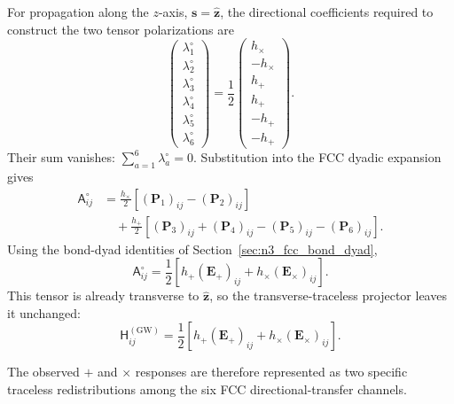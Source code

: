For propagation along the $z$-axis, $\mathbf{s}=\hat{\mathbf{z}}$, the directional coefficients required to construct the two tensor polarizations are
\begin{equation}
    \begin{pmatrix}
        \lambda_{1}^{\circ} \\
        \lambda_{2}^{\circ} \\
        \lambda_{3}^{\circ} \\
        \lambda_{4}^{\circ} \\
        \lambda_{5}^{\circ} \\
        \lambda_{6}^{\circ}
    \end{pmatrix}
    = \frac{1}{2}
    \begin{pmatrix}
        h_{\times} \\
        -h_{\times} \\
        h_{+} \\
        h_{+} \\
        -h_{+} \\
        -h_{+}
    \end{pmatrix}.
\end{equation}
Their sum vanishes: $\sum_{a=1}^{6} \lambda_{a}^{\circ} = 0$. Substitution into the FCC dyadic expansion gives
\begin{equation}
    \begin{aligned}
        \mathsf{A}_{ij}^{\circ} &= \frac{h_{\times}}{2} \left[ (\mathbf{P}_{1})_{ij} - (\mathbf{P}_{2})_{ij} \right] \\
        &\quad + \frac{h_{+}}{2} \left[ (\mathbf{P}_{3})_{ij} + (\mathbf{P}_{4})_{ij} - (\mathbf{P}_{5})_{ij} - (\mathbf{P}_{6})_{ij} \right].
    \end{aligned}
\end{equation}
Using the bond-dyad identities of Section~\ref{sec:n3_fcc_bond_dyad},
\begin{equation}
    \mathsf{A}_{ij}^{\circ} = \frac{1}{2} \left[ h_{+}(\mathbf{E}_{+})_{ij} + h_{\times}(\mathbf{E}_{\times})_{ij} \right].
\end{equation}
This tensor is already transverse to $\hat{\mathbf{z}}$, so the transverse-traceless projector leaves it unchanged:
\begin{equation}
    \mathsf{H}_{ij}^{(\mathrm{GW})} = \frac{1}{2} \left[ h_{+}(\mathbf{E}_{+})_{ij} + h_{\times}(\mathbf{E}_{\times})_{ij} \right].
\end{equation}

The observed $+$ and $\times$ responses are therefore represented as two specific traceless redistributions among the six FCC directional-transfer channels.

